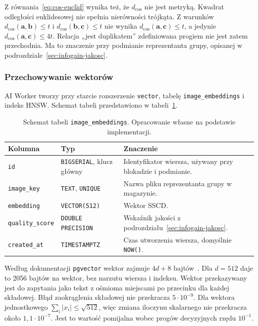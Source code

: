 Z równania~\eqref{eq:cos-euclid} wynika też, że \(d_{\cos}\)
nie jest metryką. Kwadrat odległości euklidesowej nie spełnia
nierówności trójkąta. Z warunków
\(d_{\cos}(\mathbf{a},\mathbf{b})\leq t\)
i \(d_{\cos}(\mathbf{b},\mathbf{c})\leq t\) nie wynika
\(d_{\cos}(\mathbf{a},\mathbf{c})\leq t\), a jedynie
\(d_{\cos}(\mathbf{a},\mathbf{c})\leq 4t\). Relacja „jest
duplikatem” zdefiniowana progiem nie jest zatem przechodnia.
Ma to znaczenie przy podmianie reprezentanta grupy, opisanej
w podrozdziale~\ref{sec:infogain-jakosc}.

\subsubsection{Przechowywanie wektorów}

AI Worker tworzy przy starcie rozszerzenie \texttt{vector}, tabelę
\texttt{image\_embeddings} i indeks HNSW. Schemat tabeli przedstawiono
w tabeli~\ref{tab:pg-schema}.

\begin{table}[!htbp]
\centering
\caption{Schemat tabeli \texttt{image\_embeddings}.
Opracowanie własne na podstawie implementacji.}
\label{tab:pg-schema}
\begin{tabular}{|l|l|p{}|}
\hline
\textbf{Kolumna} & \textbf{Typ} & \textbf{Znaczenie} \\
\hline
\texttt{id} & \texttt{BIGSERIAL}, klucz główny & Identyfikator wiersza,
używany przy blokadzie i podmianie. \\
\hline
\texttt{image\_key} & \texttt{TEXT}, \texttt{UNIQUE} & Nazwa pliku
reprezentanta grupy w magazynie. \\
\hline
\texttt{embedding} & \texttt{VECTOR(512)} & Wektor SSCD. \\
\hline
\texttt{quality\_score} & \texttt{DOUBLE PRECISION} & Wskaźnik jakości
z podrozdziału~\ref{sec:infogain-jakosc}. \\
\hline
\texttt{created\_at} & \texttt{TIMESTAMPTZ} & Czas utworzenia wiersza,
domyślnie \texttt{NOW()}. \\
\hline
\end{tabular}
\end{table}

Według dokumentacji \texttt{pgvector} wektor zajmuje
\(4d+8\) bajtów~\cite{pgvector_docs}. Dla \(d=512\) daje to
2056 bajtów na wektor, bez narzutu wiersza i indeksu.
Wektor przekazywany jest do zapytania jako tekst z ośmioma miejscami
po przecinku dla każdej składowej. Błąd zaokrąglenia składowej nie
przekracza \(5\cdot10^{-9}\). Dla wektora jednostkowego
\(\sum_i|x_i|\leq\sqrt{512}\), więc zmiana iloczynu skalarnego
nie przekracza około \(1{,}1\cdot10^{-7}\). Jest to wartość
pomijalna wobec progów decyzyjnych rzędu \(10^{-1}\).

